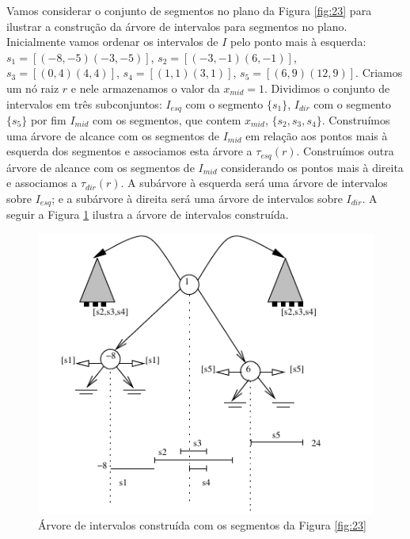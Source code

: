 Vamos considerar o conjunto de segmentos no plano da Figura \ref{fig:23} para ilustrar a construção da árvore de intervalos para segmentos no plano.
Inicialmente vamos ordenar os intervalos de $I$ pelo ponto mais à esquerda: $s_1 = [(-8,-5)(-3,-5)]$, $s_2 =[(-3,-1)(6, -1)]$, $s_3 = [(0,4)(4,4)]$, $s_4 =[(1,1)(3,1)]$, $s_5 = [(6,9)(12,9)]$. Criamos um nó raiz $r$ e nele armazenamos o valor da $x_{mid}  = 1$. Dividimos o conjunto de intervalos em três subconjuntos: $I_{esq}$ com o segmento $\{s_1\}$, $I_{dir}$ com o segmento $\{s_5\}$ por fim $I_{mid}$ com os segmentos, que contem $x_{mid}$, $\{ s_2, s_3, s_4\}$. Construímos uma árvore de alcance com os segmentos de $I_{mid}$ em relação aos pontos mais à esquerda dos segmentos e associamos esta árvore a $\tau_{esq}(r)$. Construímos outra árvore de alcance com os segmentos de $I_{mid}$ considerando os pontos mais à direita e associamos a $\tau_{dir}(r)$. A subárvore à esquerda será uma árvore de intervalos sobre $I_{esq}$; e a subárvore à direita será uma árvore de intervalos sobre $I_{dir}$. A seguir a Figura \ref{fig:24} ilustra a árvore de intervalos construída.

\begin{figure}[h!]
    \begin{center}
        \includegraphics[scale=1.5]{images/interval_tree9.pdf}
    \end{center}
    \caption{ Árvore de intervalos construída com os segmentos da Figura \ref{fig:23}}
    \label{fig:24}
\end{figure}


